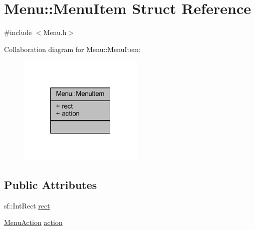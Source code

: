 \hypertarget{struct_menu_1_1_menu_item}{\section{Menu\+:\+:Menu\+Item Struct Reference}
\label{struct_menu_1_1_menu_item}
}


{\ttfamily \#include $<$Menu.\+h$>$}



Collaboration diagram for Menu\+:\+:Menu\+Item\+:\nopagebreak
\begin{figure}[H]
\begin{center}
\leavevmode
\includegraphics[width=169pt]{struct_menu_1_1_menu_item__coll__graph}
\end{center}
\end{figure}
\subsection*{Public Attributes}
\begin{DoxyCompactItemize}
\item 
sf\+::\+Int\+Rect \hyperlink{struct_menu_1_1_menu_item_ae1998c7b6dad5e12faa131248eb750e3}{rect}
\item 
\hyperlink{class_menu_a2d708ce8df47ab5feaea1ba559a938d3}{Menu\+Action} \hyperlink{struct_menu_1_1_menu_item_a59b62e6cbc3ecae51b46e787b56179f9}{action}
\end{DoxyCompactItemize}



